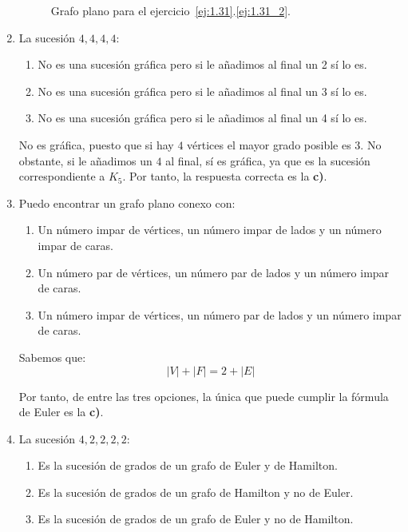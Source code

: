 \begin{ejercicio}
\begin{enumerate}
\begin{figure}
            \caption{Grafo plano para el ejercicio~\ref{ej:1.31}.\ref{ej:1.31_2}.}
            \label{fig:1.31_2}
        \end{figure}
        \item La sucesión $4, 4, 4, 4$:
        \begin{enumerate}
            \item No es una sucesión gráfica pero si le añadimos al final un 2 sí lo es.
            \item No es una sucesión gráfica pero si le añadimos al final un 3 sí lo es.
            \item No es una sucesión gráfica pero si le añadimos al final un 4 sí lo es.
        \end{enumerate}

        No es gráfica, puesto que si hay $4$ vértices el mayor grado posible es $3$. No obstante, si le añadimos un $4$ al final, sí es gráfica, ya que es la sucesión correspondiente a $K_5$. Por tanto, la respuesta correcta es la \textbf{c)}.
        \item Puedo encontrar un grafo plano conexo con:
        \begin{enumerate}
            \item Un número impar de vértices, un número impar de lados y un número impar de caras.
            \item Un número par de vértices, un número par de lados y un número impar de caras.
            \item Un número impar de vértices, un número par de lados y un número impar de caras.
        \end{enumerate}

        Sabemos que:
        \begin{equation*}
            |V|+|F|=2+|E|
        \end{equation*}

        Por tanto, de entre las tres opciones, la única que puede cumplir la fórmula de Euler es la \textbf{c)}.

        \item\label{ej:1.31_5}
        La sucesión $4, 2, 2, 2, 2$:
        \begin{enumerate}
            \item Es la sucesión de grados de un grafo de Euler y de Hamilton.
            \item Es la sucesión de grados de un grafo de Hamilton y no de Euler.
            \item Es la sucesión de grados de un grafo de Euler y no de Hamilton.
        \end{enumerate}


\end{enumerate}
\end{ejercicio}
